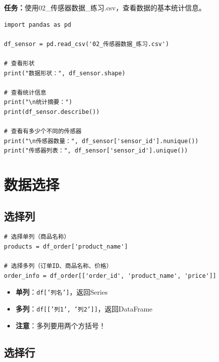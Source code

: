 \documentclass[12pt,a4paper]{article}
\begin{document}
\begin{practicebox}
\textbf{任务：}使用02\_传感器数据\_练习.csv，查看数据的基本统计信息。

\begin{lstlisting}
import pandas as pd

df_sensor = pd.read_csv('02_传感器数据_练习.csv')

# 查看形状
print("数据形状：", df_sensor.shape)

# 查看统计信息
print("\n统计摘要：")
print(df_sensor.describe())

# 查看有多少个不同的传感器
print("\n传感器数量：", df_sensor['sensor_id'].nunique())
print("传感器列表：", df_sensor['sensor_id'].unique())
\end{lstlisting}
\end{practicebox}

\section{数据选择}

\subsection{选择列}

\begin{lstlisting}[caption={选择单列和多列}]
# 选择单列（商品名称）
products = df_order['product_name']

# 选择多列（订单ID、商品名称、价格）
order_info = df_order[['order_id', 'product_name', 'price']]
\end{lstlisting}

\begin{knowledgebox}
\begin{itemize}
    \item \textbf{单列}：\texttt{df['列名']}，返回Series
    \item \textbf{多列}：\texttt{df[['列1', '列2']]}，返回DataFrame
    \item \textbf{注意}：多列要用两个方括号！
\end{itemize}
\end{knowledgebox}

\subsection{选择行}
\end{document}

